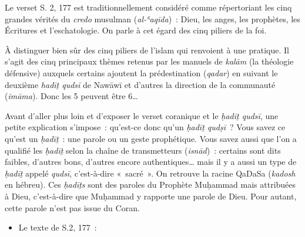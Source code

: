 
Le verset S. 2, 177 est traditionnellement considéré comme répertoriant
les cinq grandes vérités du \emph{credo} musulman (\emph{al-ʿaqīda})~:
Dieu, les anges, les prophètes, les Écritures et l'eschatologie. On
parle à cet égard des cinq piliers de la foi.

À distinguer bien sûr des cinq piliers de l'islam qui renvoient à une
pratique. Il s'agit des cinq principaux thèmes retenus par les manuels
de \emph{kalām} (la théologie défensive) auxquels certains ajoutent la
prédestination (\emph{qadar}) en suivant le deuxième \emph{hadīṯ qudsī}
de Nawāwī et d'autres la direction de la communauté (\emph{imāma}). Donc
les 5 peuvent être 6\ldots{}

Avant d'aller plus loin et d'exposer le verset coranique et le
\emph{ḥadīṯ qudsī}, une petite explication s'impose~: qu'est-ce donc
qu'un \emph{ḥadīṯ qudṣī}~? Vous savez ce qu'est un \emph{ḥadīṯ}~: une
parole ou un geste prophétique. Vous savez aussi que l'on a qualifié les
\emph{ḥadīṯ} selon la chaîne de transmetteurs (\emph{isnād})~: certains
sont dits faibles, d'autres bons, d'autres encore authentiques\ldots{}
mais il y a aussi un type de \emph{ḥadīṯ} appelé \emph{qudsī},
c'est-à-dire «~sacré~». On retrouve la racine QaDaSa (\emph{kadosh} en
hébreu). Ces \emph{ḥadīṯs} sont des paroles du Prophète Muḥammad mais
attribuées à Dieu, c'est-à-dire que Muḥammad y rapporte une parole de
Dieu. Pour autant, cette parole n'est pas issue du Coran.

\begin{itemize}
\item
  Le texte de S.2, 177~:
\end{itemize}

